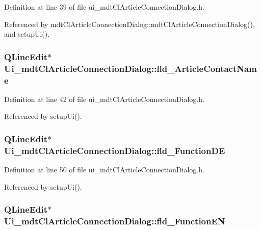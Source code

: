 Definition at line 39 of file ui\-\_\-mdt\-Cl\-Article\-Connection\-Dialog.\-h.



Referenced by mdt\-Cl\-Article\-Connection\-Dialog\-::mdt\-Cl\-Article\-Connection\-Dialog(), and setup\-Ui().

\hypertarget{class_ui__mdt_cl_article_connection_dialog_aa870a49559d95f051a8e2f70d0577472}{
\subsubsection[{fld\-\_\-\-Article\-Contact\-Name}]{\setlength{\rightskip}{0pt plus 5cm}Q\-Line\-Edit$\ast$ Ui\-\_\-mdt\-Cl\-Article\-Connection\-Dialog\-::fld\-\_\-\-Article\-Contact\-Name}}\label{class_ui__mdt_cl_article_connection_dialog_aa870a49559d95f051a8e2f70d0577472}


Definition at line 42 of file ui\-\_\-mdt\-Cl\-Article\-Connection\-Dialog.\-h.



Referenced by setup\-Ui().

\hypertarget{class_ui__mdt_cl_article_connection_dialog_af060d49fa80c8ed5b05f8fe753d16eab}{
\subsubsection[{fld\-\_\-\-Function\-D\-E}]{\setlength{\rightskip}{0pt plus 5cm}Q\-Line\-Edit$\ast$ Ui\-\_\-mdt\-Cl\-Article\-Connection\-Dialog\-::fld\-\_\-\-Function\-D\-E}}\label{class_ui__mdt_cl_article_connection_dialog_af060d49fa80c8ed5b05f8fe753d16eab}


Definition at line 50 of file ui\-\_\-mdt\-Cl\-Article\-Connection\-Dialog.\-h.



Referenced by setup\-Ui().

\hypertarget{class_ui__mdt_cl_article_connection_dialog_acd520706fcd867df18a357c1ad785e9f}{
\subsubsection[{fld\-\_\-\-Function\-E\-N}]{\setlength{\rightskip}{0pt plus 5cm}Q\-Line\-Edit$\ast$ Ui\-\_\-mdt\-Cl\-Article\-Connection\-Dialog\-::fld\-\_\-\-Function\-E\-N}}\label{class_ui__mdt_cl_article_connection_dialog_acd520706fcd867df18a357c1ad785e9f}


